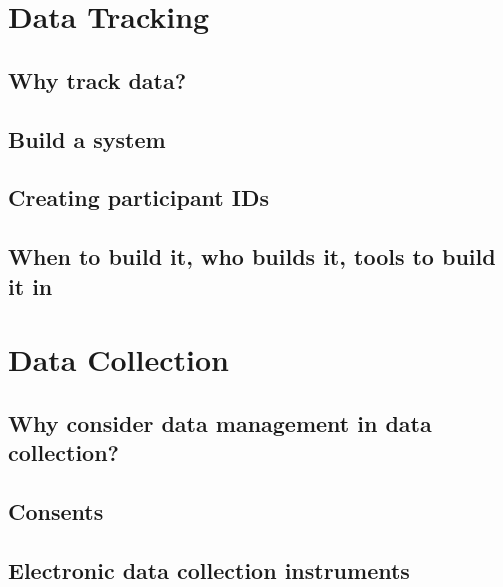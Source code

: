 \documentclass[
]{book}
\begin{document}
\hypertarget{data-tracking}{%
\chapter{Data Tracking}\label{data-tracking}}

\hypertarget{why-track-data}{%
\section{Why track data?}\label{why-track-data}}

\hypertarget{build-a-system}{%
\section{Build a system}\label{build-a-system}}

\hypertarget{ids}{%
\section{Creating participant IDs}\label{ids}}

\hypertarget{when-to-build-it-who-builds-it-tools-to-build-it-in}{%
\section{When to build it, who builds it, tools to build it in}\label{when-to-build-it-who-builds-it-tools-to-build-it-in}}

\hypertarget{data-collection}{%
\chapter{Data Collection}\label{data-collection}}

\hypertarget{why-consider-data-management-in-data-collection}{%
\section{Why consider data management in data collection?}\label{why-consider-data-management-in-data-collection}}

\hypertarget{consents}{%
\section{Consents}\label{consents}}

\hypertarget{electronic-data-collection-instruments}{%
\section{Electronic data collection instruments}\label{electronic-data-collection-instruments}}
\end{document}
